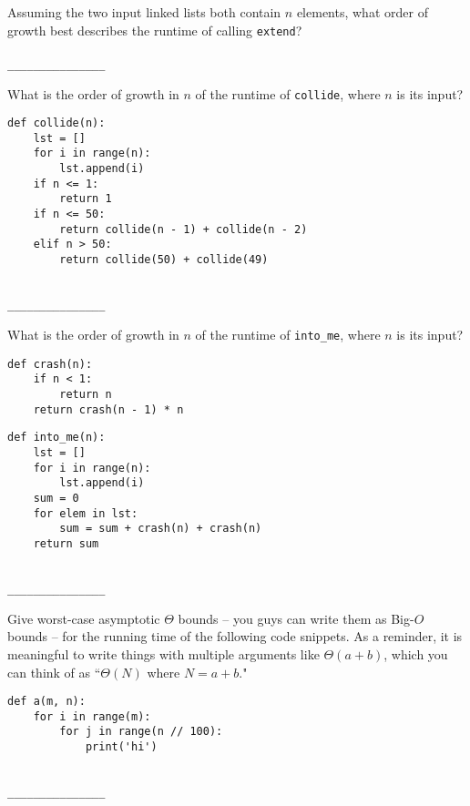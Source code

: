 \documentclass[twoside]{article}
\begin{document}
\begin{enumerate}
\begin{enumerate}
Assuming the two input linked lists both contain $n$ elements, what order of growth best describes the runtime of calling \texttt{extend}?
~\\\\
\lstinline{_______________}
\end{enumerate}


\begin{enumerate}
What is the order of growth in $n$ of the runtime of \texttt{collide}, where $n$ is its input?

\begin{lstlisting}
def collide(n):
    lst = []
    for i in range(n):
        lst.append(i)
    if n <= 1:
        return 1
    if n <= 50:
        return collide(n - 1) + collide(n - 2)
    elif n > 50:
        return collide(50) + collide(49)
\end{lstlisting}
~\\
\lstinline{_______________}

What is the order of growth in $n$ of the runtime of \texttt{into\_me}, where $n$ is its input?

\begin{lstlisting}
def crash(n):
    if n < 1:
        return n
    return crash(n - 1) * n
\end{lstlisting}

\newpage

\begin{lstlisting}
def into_me(n):
    lst = []
    for i in range(n):
        lst.append(i)
    sum = 0
    for elem in lst:
        sum = sum + crash(n) + crash(n)
    return sum
\end{lstlisting}
~\\
\lstinline{_______________}
\end{enumerate}


Give worst-case asymptotic $\Theta$ bounds -- you guys can write them as Big-$O$ bounds -- for the running time of the following code snippets. As a reminder, it is meaningful to write things with multiple arguments like $\Theta(a + b)$, which you can think of as ``$\Theta(N)$ where $N = a + b$."

\begin{enumerate}
\begin{lstlisting}
def a(m, n):
    for i in range(m):
        for j in range(n // 100):
            print('hi')
\end{lstlisting}
~\\
\lstinline{_______________}


\end{enumerate}
\end{enumerate}
\end{document}
